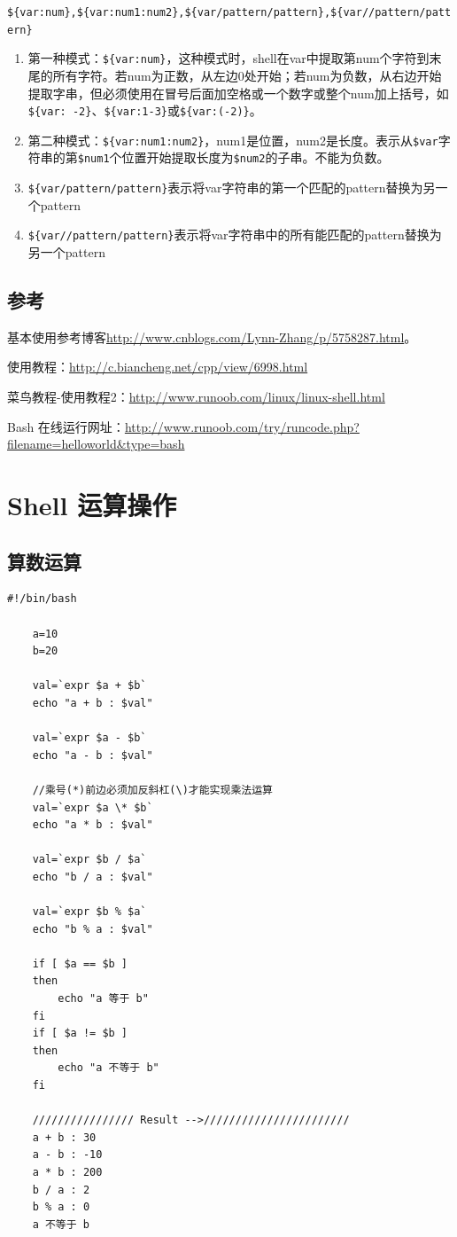 \documentclass[UTF8,a4paper,12pt]{ctexbook}
\begin{document}
					\verb|${var:num},${var:num1:num2},${var/pattern/pattern},${var//pattern/pattern}|
					
				\begin{enumerate}
					\item 第一种模式：\verb|${var:num}|，这种模式时，shell在var中提取第num个字符到末尾的所有字符。若num为正数，从左边0处开始；若num为负数，从右边开始提取字串，但必须使用在冒号后面加空格或一个数字或整个num加上括号，如\verb|${var: -2}|、\verb|${var:1-3}|或\verb|${var:(-2)}|。  
					
					\item 第二种模式：\verb|${var:num1:num2}|，num1是位置，num2是长度。表示从\verb|$var|字符串的第\verb|$num1|个位置开始提取长度为\verb|$num2|的子串。不能为负数。
					
					\item \verb|${var/pattern/pattern}|表示将var字符串的第一个匹配的pattern替换为另一个pattern
					\item \verb|${var//pattern/pattern}|表示将var字符串中的所有能匹配的pattern替换为另一个pattern		
				\end{enumerate}
	    \section{参考}基本使用参考博客\url{http://www.cnblogs.com/Lynn-Zhang/p/5758287.html}。
		 
			 使用教程：\url{http://c.biancheng.net/cpp/view/6998.html}
			 
			 菜鸟教程-使用教程2：\url{http://www.runoob.com/linux/linux-shell.html}
			 
			 Bash 在线运行网址：\url{http://www.runoob.com/try/runcode.php?filename=helloworld&type=bash}

\chapter{Shell 运算操作}
		 \section{算数运算}
			 \begin{lstlisting}[xleftmargin=.06\textwidth]
	#!/bin/bash
	
	a=10
	b=20
	
	val=`expr $a + $b`
	echo "a + b : $val"
	
	val=`expr $a - $b`
	echo "a - b : $val"
	
	//乘号(*)前边必须加反斜杠(\)才能实现乘法运算
	val=`expr $a \* $b`
	echo "a * b : $val"
	
	val=`expr $b / $a`
	echo "b / a : $val"
	
	val=`expr $b % $a`
	echo "b % a : $val"
	
	if [ $a == $b ]
	then
		echo "a 等于 b"
	fi
	if [ $a != $b ]
	then
		echo "a 不等于 b"
	fi
	
	//////////////// Result -->///////////////////////
	a + b : 30
	a - b : -10
	a * b : 200
	b / a : 2
	b % a : 0
	a 不等于 b
			 \end{lstlisting}
\end{document}
